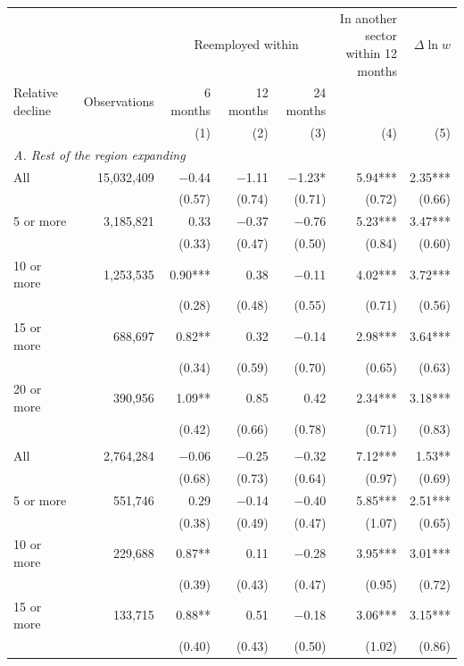 {\footnotesize
\setlength{\tabcolsep}{5pt}
\begin{threeparttable}
\begin{tabular}{lrrrrrr}
\toprule
 & & \multicolumn{3}{c}{Reemployed within} & \shortstack{In another sector\\within 12 months} & $\Delta \ln w$ \\
\cmidrule(lr){3-5}
Relative decline & Observations & 6 months & 12 months & 24 months & & \\
& & (1) & (2) & (3) & (4) & (5) \\
\midrule
\multicolumn{7}{l}{\textit{A. Rest of the region expanding}} \\
All & 15,032,409 & $-$0.44 & $-$1.11 & $-$1.23* & 5.94*** & 2.35*** \\
 & & (0.57) & (0.74) & (0.71) & (0.72) & (0.66) \\
5 or more & 3,185,821 & 0.33 & $-$0.37 & $-$0.76 & 5.23*** & 3.47*** \\
 & & (0.33) & (0.47) & (0.50) & (0.84) & (0.60) \\
10 or more & 1,253,535 & 0.90*** & 0.38 & $-$0.11 & 4.02*** & 3.72*** \\
 & & (0.28) & (0.48) & (0.55) & (0.71) & (0.56) \\
15 or more & 688,697 & 0.82** & 0.32 & $-$0.14 & 2.98*** & 3.64*** \\
 & & (0.34) & (0.59) & (0.70) & (0.65) & (0.63) \\
20 or more & 390,956 & 1.09** & 0.85 & 0.42 & 2.34*** & 3.18*** \\
 & & (0.42) & (0.66) & (0.78) & (0.71) & (0.83) \\
\addlinespace[3pt]
\multicolumn{7}{l}{\textit{B. Rest of the region expanding, tenure under 6 months}} \\
All & 2,764,284 & $-$0.06 & $-$0.25 & $-$0.32 & 7.12*** & 1.53** \\
 & & (0.68) & (0.73) & (0.64) & (0.97) & (0.69) \\
5 or more & 551,746 & 0.29 & $-$0.14 & $-$0.40 & 5.85*** & 2.51*** \\
 & & (0.38) & (0.49) & (0.47) & (1.07) & (0.65) \\
10 or more & 229,688 & 0.87** & 0.11 & $-$0.28 & 3.95*** & 3.01*** \\
 & & (0.39) & (0.43) & (0.47) & (0.95) & (0.72) \\
15 or more & 133,715 & 0.88** & 0.51 & $-$0.18 & 3.06*** & 3.15*** \\
 & & (0.40) & (0.43) & (0.50) & (1.02) & (0.86) \\

\end{tabular}
\end{threeparttable}}
